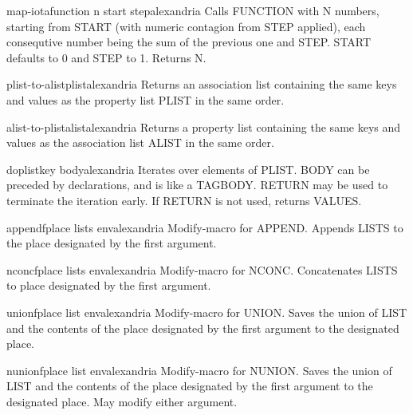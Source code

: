 \begin{function}{map-iota}{function n \key start step}{alexandria}{}
  Calls FUNCTION with N numbers, starting from START (with numeric contagion
from STEP applied), each consequtive number being the sum of the previous one
and STEP. START defaults to 0 and STEP to 1. Returns N.
\end{function}

\begin{function}{plist-to-alist}{plist}{alexandria}{}
  Returns an association list containing the same keys and values as the
property list PLIST in the same order.
\end{function}

\begin{function}{alist-to-plist}{alist}{alexandria}{}
  Returns a property list containing the same keys and values as the
association list ALIST in the same order.
\end{function}

\begin{macro}{doplist}{key \body body}{alexandria}{}
  Iterates over elements of PLIST. BODY can be preceded by
declarations, and is like a TAGBODY. RETURN may be used to terminate
the iteration early. If RETURN is not used, returns VALUES.
\end{macro}

\begin{macro}{appendf}{place \rest lists \env env}{alexandria}{}
  Modify-macro for APPEND. Appends LISTS to the place designated by the first
argument.
\end{macro}

\begin{macro}{nconcf}{place \rest lists \env env}{alexandria}{}
  Modify-macro for NCONC. Concatenates LISTS to place designated by the first
argument.
\end{macro}

\begin{macro}{unionf}{place list \env env}{alexandria}{}
  Modify-macro for UNION. Saves the union of LIST and the contents of the
place designated by the first argument to the designated place.
\end{macro}

\begin{macro}{nunionf}{place list \env env}{alexandria}{}
  Modify-macro for NUNION. Saves the union of LIST and the contents of the
place designated by the first argument to the designated place. May modify
either argument.
\end{macro}


